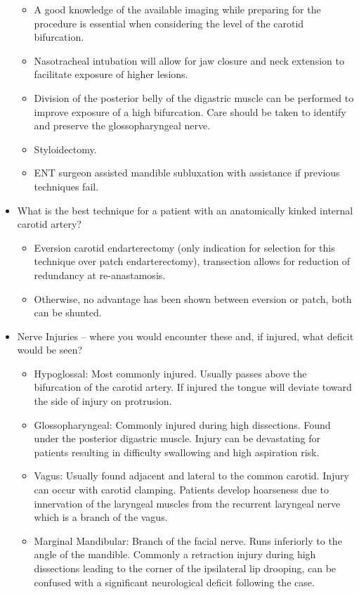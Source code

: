 \documentclass[
]{book}
\begin{document}
\begin{itemize}
  \begin{itemize}
  \item
    A good knowledge of the available imaging while preparing for
    the procedure is essential when considering the level of the
    carotid bifurcation.
  \item
    Nasotracheal intubation will allow for jaw closure and neck
    extension to facilitate exposure of higher lesions.
  \item
    Division of the posterior belly of the digastric muscle can be
    performed to improve exposure of a high bifurcation. Care should
    be taken to identify and preserve the glossopharyngeal nerve.
  \item
    Styloidectomy.
  \item
    ENT surgeon assisted mandible subluxation with assistance if
    previous techniques fail.
  \end{itemize}
\item
  What is the best technique for a patient with an anatomically kinked
  internal carotid artery?

  \begin{itemize}
  \item
    Eversion carotid endarterectomy (only indication for selection
    for this technique over patch endarterectomy), transection
    allows for reduction of redundancy at re-anastamosis.
  \item
    Otherwise, no advantage has been shown between eversion or
    patch, both can be shunted.
  \end{itemize}
\item
  Nerve Injuries -- where you would encounter these and, if injured,
  what deficit would be seen?

  \begin{itemize}
  \item
    Hypoglossal: Most commonly injured. Usually passes above the
    bifurcation of the carotid artery. If injured the tongue will
    deviate toward the side of injury on protrusion.
  \item
    Glossopharyngeal: Commonly injured during high dissections.
    Found under the posterior digastric muscle. Injury can be
    devastating for patients resulting in difficulty swallowing and
    high aspiration risk.
  \item
    Vagus: Usually found adjacent and lateral to the common carotid.
    Injury can occur with carotid clamping. Patients develop
    hoarseness due to innervation of the laryngeal muscles from the
    recurrent laryngeal nerve which is a branch of the vagus.
  \item
    Marginal Mandibular: Branch of the facial nerve. Runs inferiorly
    to the angle of the mandible. Commonly a retraction injury
    during high dissections leading to the corner of the ipsilateral
    lip drooping, can be confused with a significant neurological
    deficit following the case.
  \end{itemize}
\end{itemize}
\end{document}
